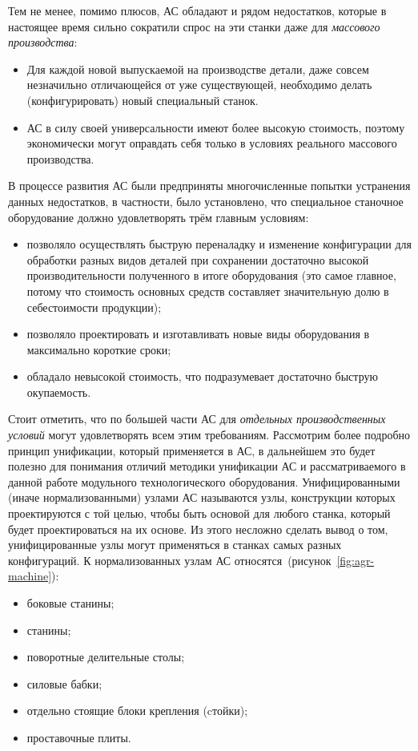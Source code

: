 Тем не менее, помимо плюсов, АС обладают и рядом недостатков, которые в настоящее время сильно сократили спрос на эти станки даже для \textit{массового производства}:

\begin{itemize}
	\item Для каждой новой выпускаемой на производстве детали, даже совсем незначильно отличающейся от уже существующей, необходимо делать (конфигурировать) новый специальный станок.
	\item АС в силу своей универсальности имеют более высокую стоимость, поэтому экономически могут оправдать себя только в условиях реального массового производства.
\end{itemize}

В процессе развития АС были предприняты многочисленные попытки устранения данных недостатков, в частности, было установлено, что специальное станочное оборудование должно удовлетворять трём главным условиям:

\begin{itemize}
	\item позволяло осуществлять быструю переналадку и изменение конфигурации для обработки разных видов деталей при сохранении достаточно высокой производительности полученного в итоге оборудования (это самое главное, потому что стоимость основных средств составляет значительную долю в себестоимости продукции);
	\item позволяло проектировать и изготавливать новые виды оборудования в максимально короткие сроки;
	\item обладало невысокой стоимость, что подразумевает достаточно быструю окупаемость.
\end{itemize}


Стоит отметить, что по большей части АС для \textit{отдельных производственных условий} могут удовлетворять всем этим требованиям. Рассмотрим более подробно принцип унификации, который применяется в АС, в дальнейшем это будет полезно для понимания отличий методики унификации АС и рассматриваемого в данной работе модульного технологического оборудования. Унифицированными (иначе нормализованными) узлами АС называются узлы, конструкции которых проектируются с той целью, чтобы быть основой для любого станка, который будет проектироваться на их основе. Из этого несложно сделать вывод о том, унифицированные узлы могут применяться в станках самых разных конфигураций. К нормализованных узлам АС относятся~(рисунок~\cref{fig:agr-machine}):

\begin{itemize}
	\item боковые станины;
	\item станины;
	\item поворотные делительные столы;
	\item силовые бабки;
	\item отдельно стоящие блоки крепления (cтойки); 
	\item проставочные плиты.
\end{itemize}

